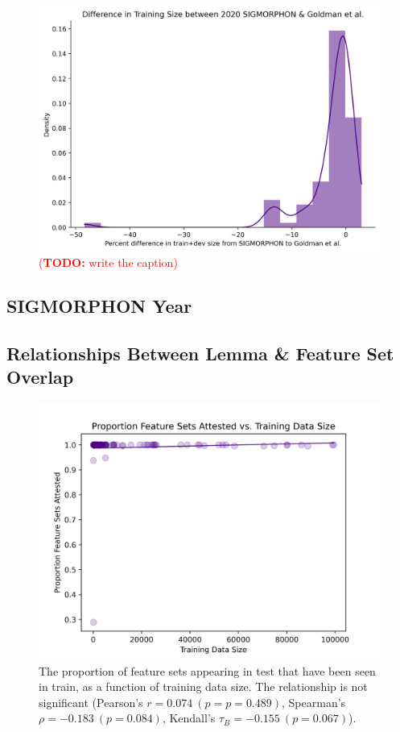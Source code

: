 \documentclass[11pt]{article}
\newcommand{\todo}[1]{\textcolor{red}{(\textbf{TODO:} #1)}}
\begin{document}
\begin{figure}[h!]
\centering
\includegraphics[width=0.8\linewidth]{figs/training_difference.png}
\caption{\todo{write the caption}}
\label{fig:training_difference}
\end{figure}
\subsection{SIGMORPHON Year }


\subsection{Relationships Between Lemma \& Feature Set Overlap}

\begin{figure}[h!]
\centering
\includegraphics[width=0.8\linewidth]{figs/feats_attested.png}
\caption{The proportion of feature sets appearing in test that have been seen in train, as a function of training data size. The relationship is not significant (Pearson's $r = 0.074~(p=p = 0.489)$, Spearman's $\rho = -0.183~(p=0.084)$, Kendall's $\tau_B = -0.155~(p = 0.067)$).}
\label{fig:feats_attested}
\end{figure}
\end{document}
